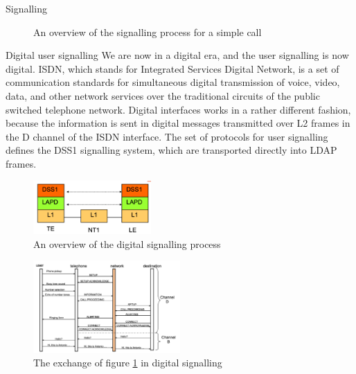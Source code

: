 \begin{section}{Signalling}
\begin{figure}[h]
    \caption{An overview of the signalling process for a simple call}
    \label{fig:signalling}
  \end{figure}
  \begin{subsection}{Digital user signalling}
    We are now in a digital era, and the user signalling is now digital. ISDN, which stands for
    Integrated Services Digital Network, is a set of communication standards for simultaneous
    digital transmission of voice, video, data, and other network services over the traditional
    circuits of the public switched telephone network. Digital interfaces works in
    a rather different fashion, because the information is sent in digital messages transmitted over
    L2 frames in the D channel of the ISDN interface. The set of protocols for user signalling
    defines the DSS1 signalling system, which are transported directly into LDAP frames.

    \begin{figure}[h]
      \centering
      \includegraphics[width=0.4\textwidth]{img/wireless/digital user signalling.png}
      \caption{An overview of the digital signalling process}
      \label{fig:digital-signalling}
    \end{figure}

    \begin{figure}[h]
      \centering
      \includegraphics[width=0.5\textwidth]{img/wireless/digital user signalling exhange.png}
      \caption{The exchange of figure \ref{fig:signalling} in digital signalling}
      \label{fig:digital-signalling-2}
    \end{figure}
  \end{subsection}
  

\end{section}
